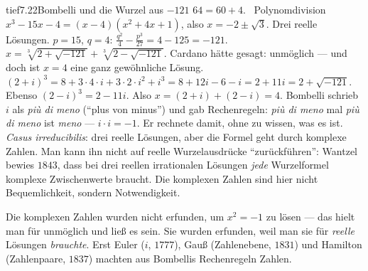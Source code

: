 \begin{loesungkarte}{tief}{7.22}{Bombelli und die Wurzel aus $-121$}
$64 = 60 + 4$. \checkmark\ Polynomdivision $x^{3} - 15x - 4 = (x - 4)(x^{2} + 4x + 1)$, also $x = -2\pm\sqrt3$. Drei reelle Lösungen.
$p = 15$, $q = 4$: $\frac{q^{2}}4 - \frac{p^{3}}{27} = 4 - 125 = -121$. $x = \sqrt[3]{2 + \sqrt{-121}} + \sqrt[3]{2 - \sqrt{-121}}$. Cardano hätte gesagt: unmöglich --- und doch ist $x = 4$ eine ganz gewöhnliche Lösung.
$(2 + i)^{3} = 8 + 3\cdot4\cdot i + 3\cdot2\cdot i^{2} + i^{3} = 8 + 12i - 6 - i = 2 + 11i = 2 + \sqrt{-121}$. Ebenso $(2 - i)^{3} = 2 - 11i$. Also $x = (2 + i) + (2 - i) = 4$. Bombelli schrieb $i$ als \emph{più di meno} (\enquote{plus von minus}) und gab Rechenregeln: \emph{più di meno} mal \emph{più di meno} ist \emph{meno} --- $i\cdot i = -1$. Er rechnete damit, ohne zu wissen, was es ist.
\emph{Casus irreducibilis}: drei reelle Lösungen, aber die Formel geht durch komplexe Zahlen. Man kann ihn nicht auf reelle Wurzelausdrücke \enquote{zurückführen}: Wantzel bewies $1843$, dass bei drei reellen irrationalen Lösungen \emph{jede} Wurzelformel komplexe Zwischenwerte braucht. Die komplexen Zahlen sind hier nicht Bequemlichkeit, sondern Notwendigkeit.
\begin{mitnehmen}\kastentext
Die komplexen Zahlen wurden nicht erfunden, um $x^{2} = -1$ zu lösen --- das hielt man für unmöglich und ließ es sein. Sie wurden erfunden, weil man sie für \emph{reelle} Lösungen \emph{brauchte}. Erst Euler ($i$, $1777$), Gauß (Zahlenebene, $1831$) und Hamilton (Zahlenpaare, $1837$) machten aus Bombellis Rechenregeln Zahlen.
\end{mitnehmen}
\end{loesungkarte}

